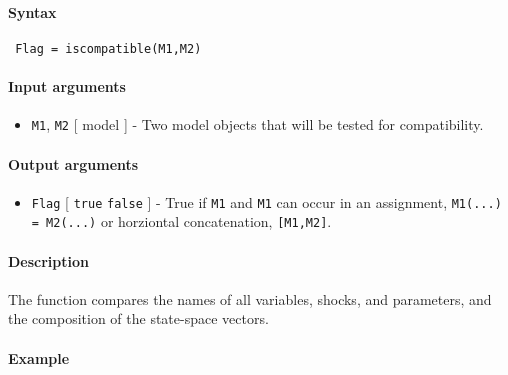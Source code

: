 


	\paragraph{Syntax}
 
 \begin{verbatim}
 Flag = iscompatible(M1,M2)
 \end{verbatim}
 
 \paragraph{Input arguments}
 
 \begin{itemize}
 \item
   \texttt{M1}, \texttt{M2} {[} model {]} - Two model objects that will
   be tested for compatibility.
 \end{itemize}
 
 \paragraph{Output arguments}
 
 \begin{itemize}
 \item
   \texttt{Flag} {[} \texttt{true} \textbar{} \texttt{false} {]} - True
   if \texttt{M1} and \texttt{M1} can occur in an assignment,
   \texttt{M1(...) = M2(...)} or horziontal concatenation,
   \texttt{{[}M1,M2{]}}.
 \end{itemize}
 
 \paragraph{Description}
 
 The function compares the names of all variables, shocks, and
 parameters, and the composition of the state-space vectors.
 
 \paragraph{Example}



